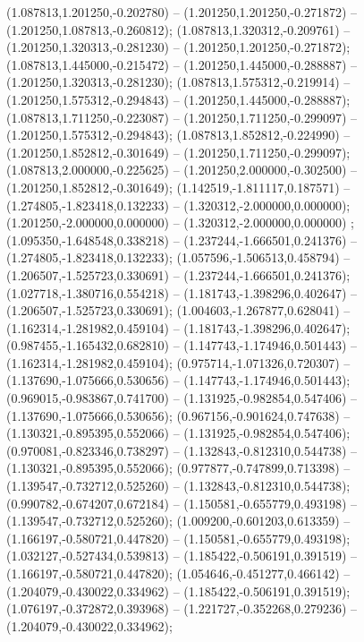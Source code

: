  (1.087813,1.201250,-0.202780) -- (1.201250,1.201250,-0.271872) -- (1.201250,1.087813,-0.260812);
 (1.087813,1.320312,-0.209761) -- (1.201250,1.320313,-0.281230) -- (1.201250,1.201250,-0.271872);
 (1.087813,1.445000,-0.215472) -- (1.201250,1.445000,-0.288887) -- (1.201250,1.320313,-0.281230);
 (1.087813,1.575312,-0.219914) -- (1.201250,1.575312,-0.294843) -- (1.201250,1.445000,-0.288887);
 (1.087813,1.711250,-0.223087) -- (1.201250,1.711250,-0.299097) -- (1.201250,1.575312,-0.294843);
 (1.087813,1.852812,-0.224990) -- (1.201250,1.852812,-0.301649) -- (1.201250,1.711250,-0.299097);
 (1.087813,2.000000,-0.225625) -- (1.201250,2.000000,-0.302500) -- (1.201250,1.852812,-0.301649);
 (1.142519,-1.811117,0.187571) -- (1.274805,-1.823418,0.132233) -- (1.320312,-2.000000,0.000000);
 (1.201250,-2.000000,0.000000) -- (1.320312,-2.000000,0.000000) ;
 (1.095350,-1.648548,0.338218) -- (1.237244,-1.666501,0.241376) -- (1.274805,-1.823418,0.132233);
 (1.057596,-1.506513,0.458794) -- (1.206507,-1.525723,0.330691) -- (1.237244,-1.666501,0.241376);
 (1.027718,-1.380716,0.554218) -- (1.181743,-1.398296,0.402647) -- (1.206507,-1.525723,0.330691);
 (1.004603,-1.267877,0.628041) -- (1.162314,-1.281982,0.459104) -- (1.181743,-1.398296,0.402647);
 (0.987455,-1.165432,0.682810) -- (1.147743,-1.174946,0.501443) -- (1.162314,-1.281982,0.459104);
 (0.975714,-1.071326,0.720307) -- (1.137690,-1.075666,0.530656) -- (1.147743,-1.174946,0.501443);
 (0.969015,-0.983867,0.741700) -- (1.131925,-0.982854,0.547406) -- (1.137690,-1.075666,0.530656);
 (0.967156,-0.901624,0.747638) -- (1.130321,-0.895395,0.552066) -- (1.131925,-0.982854,0.547406);
 (0.970081,-0.823346,0.738297) -- (1.132843,-0.812310,0.544738) -- (1.130321,-0.895395,0.552066);
 (0.977877,-0.747899,0.713398) -- (1.139547,-0.732712,0.525260) -- (1.132843,-0.812310,0.544738);
 (0.990782,-0.674207,0.672184) -- (1.150581,-0.655779,0.493198) -- (1.139547,-0.732712,0.525260);
 (1.009200,-0.601203,0.613359) -- (1.166197,-0.580721,0.447820) -- (1.150581,-0.655779,0.493198);
 (1.032127,-0.527434,0.539813) -- (1.185422,-0.506191,0.391519) -- (1.166197,-0.580721,0.447820);
 (1.054646,-0.451277,0.466142) -- (1.204079,-0.430022,0.334962) -- (1.185422,-0.506191,0.391519);
 (1.076197,-0.372872,0.393968) -- (1.221727,-0.352268,0.279236) -- (1.204079,-0.430022,0.334962);
